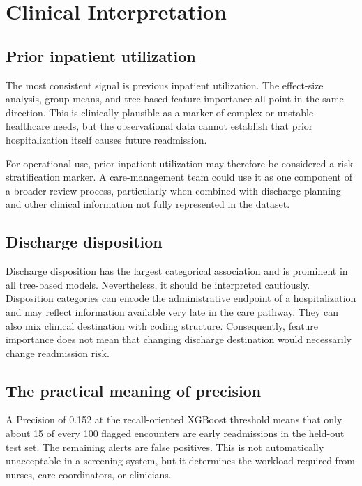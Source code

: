 \documentclass[10pt,a4paper]{article}
\begin{document}
\section{Clinical Interpretation}

\subsection{Prior inpatient utilization}

The most consistent signal is previous inpatient utilization. The effect-size analysis, group means, and tree-based feature importance all point in the same direction. This is clinically plausible as a marker of complex or unstable healthcare needs, but the observational data cannot establish that prior hospitalization itself causes future readmission.

For operational use, prior inpatient utilization may therefore be considered a risk-stratification marker. A care-management team could use it as one component of a broader review process, particularly when combined with discharge planning and other clinical information not fully represented in the dataset.

\subsection{Discharge disposition}

Discharge disposition has the largest categorical association and is prominent in all tree-based models. Nevertheless, it should be interpreted cautiously. Disposition categories can encode the administrative endpoint of a hospitalization and may reflect information available very late in the care pathway. They can also mix clinical destination with coding structure. Consequently, feature importance does not mean that changing discharge destination would necessarily change readmission risk.

\subsection{The practical meaning of precision}

A Precision of 0.152 at the recall-oriented XGBoost threshold means that only about 15 of every 100 flagged encounters are early readmissions in the held-out test set. The remaining alerts are false positives. This is not automatically unacceptable in a screening system, but it determines the workload required from nurses, care coordinators, or clinicians.
\end{document}
